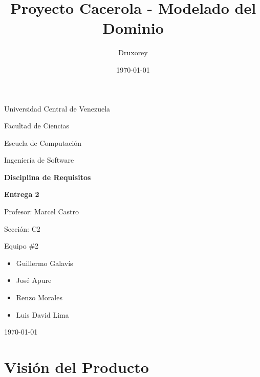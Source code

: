 \documentclass[12pt]{article}
\title{Proyecto Cacerola - Modelado del Dominio} %
\author{Druxorey} %
\date{\today} %
\begin{document}
\begin{titlepage}
	\centering
	\vspace{1cm}
	{\large {Universidad Central de Venezuela}\par}
	{\large {Facultad de Ciencias}\par}
	{\large {Escuela de Computación}\par}
	{\large {Ingeniería de Software}\par}
	\vspace{6cm}
	{\LARGE \textbf{Disciplina de Requisitos}\par}
	\vspace{0.25cm}
	{\Large \textbf{Entrega 2}\par}
	\vfill
	\begin{flushleft}
		{\large Profesor: Marcel Castro\par\vspace{-0.5em}}
		{\large Sección: C2\par\vspace{-0.5em}}
		{\large Equipo \#2\par\vspace{-1em}}
		\begin{itemize}
			\item Guillermo Galavís\vspace{-0.5em}
			\item José Apure\vspace{-0.5em}
			\item Renzo Morales\vspace{-0.5em}
			\item Luis David Lima\vspace{-0.5em}
		\end{itemize}
	\end{flushleft}
	\vspace{0.5cm}
	\centering
	{\large \today\par}
\end{titlepage}

\section{Visión del Producto}
\end{document}
